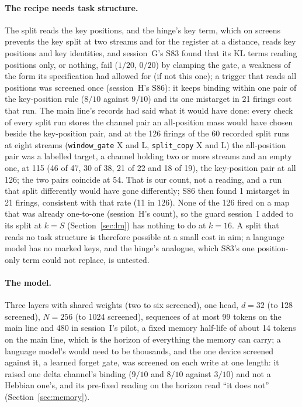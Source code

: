 \documentclass[11pt]{article}
\begin{document}
\paragraph{The recipe needs task structure.} The split reads the key positions, and the hinge's key term, which on screens prevents the key split at two streams and for the register at a distance, reads key positions and key identities, and session~G's S83 found that its KL terms reading positions only, or nothing, fail ($1/20$, $0/20$) by clamping the gate, a weakness of the form its specification had allowed for (if not this one); a trigger that reads all positions was screened once (session~H's S86): it keeps binding within one pair of the key-position rule ($8/10$ against $9/10$) and its one mistarget in 21 firings cost that run. The main line's records had said what it would have done: every check of every split run stores the channel pair an all-position mass would have chosen beside the key-position pair, and at the 126 firings of the 60 recorded split runs at eight streams (\texttt{window\_gate} X and L, \texttt{split\_copy} X and L) the all-position pair was a labelled target, a channel holding two or more streams and an empty one, at 115 (46 of 47, 30 of 38, 21 of 22 and 18 of 19), the key-position pair at all 126; the two pairs coincide at 54. That is our count, not a reading, and a run that split differently would have gone differently; S86 then found 1 mistarget in 21 firings, consistent with that rate (11 in 126). None of the 126 fired on a map that was already one-to-one (session~H's count), so the guard session~I added to its split at $k = S$ (Section~\ref{sec:lm}) has nothing to do at $k = 16$. A split that reads no task structure is therefore possible at a small cost in aim; a language model has no marked keys, and the hinge's analogue, which S83's one position-only term could not replace, is untested.

\paragraph{The model.} Three layers with shared weights (two to six screened), one head, $d = 32$ (to 128 screened), $N = 256$ (to 1024 screened), sequences of at most 99 tokens on the main line and 480 in session~I's pilot, a fixed memory half-life of about 14 tokens on the main line, which is the horizon of everything the memory can carry; a language model's would need to be thousands, and the one device screened against it, a learned forget gate, was screened on each write at one length: it raised one delta channel's binding ($9/10$ and $8/10$ against $3/10$) and not a Hebbian one's, and its pre-fixed reading on the horizon read ``it does not'' (Section~\ref{sec:memory}).
\end{document}
